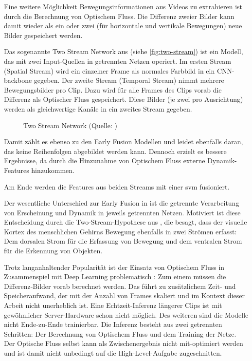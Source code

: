 Eine weitere Möglichkeit Bewegungsinformationen aus Videos zu extrahieren ist durch die Berechnung von Optischem Fluss.
Die Differenz zweier Bilder kann damit wieder als ein oder zwei (für horizontale und vertikale Bewegungen) neue Bilder gespeichert werden.

Das sogenannte Two Stream Network aus \cite{Simonyan14} (siehe \autoref{fig:two-stream}) ist ein Modell, das mit zwei Input-Quellen in getrennten Netzen operiert.
Im ersten Stream (Spatial Stream) wird ein einzelner Frame als normales Farbbild in ein CNN-backbone gegeben.
Der zweite Stream (Temporal Stream) nimmt mehrere Bewegungsbilder pro Clip.
Dazu wird für alle Frames des Clips vorab die Differenz als Optischer Fluss gespeichert.
Diese Bilder (je zwei pro Ausrichtung) werden als gleichwertige Kanäle in ein zweites Stream gegeben.

\begin{figure}[h!]
    \centering
    \caption{Two Stream Network (Quelle: \cite{Simonyan14})}
    \label{fig:two-stream}
\end{figure}

Damit zählt es ebenso zu den Early Fusion Modellen und leidet ebenfalls daran, das keine Reihenfolgen abgebildet werden kann.
Dennoch erzielt es bessere Ergebnisse, da durch die Hinzunahme von Optischem Fluss externe Dynamik-Features hinzukommen.

Am Ende werden die Features aus beiden Streams mit einer \gls{svm} fusioniert.

Der wesentliche Unterschied zur Early Fusion in \cite{Karpathy14} ist die getrennte Verarbeitung von Erscheinung und Dynamik in jeweils getrennten Netzen.
Motiviert ist diese Entscheidung durch die Two-Stream-Hypothese aus \cite{Goodale92}, die besagt, dass der visuelle Kortex des menschlichen Gehirns Bewegung ebenfalls in zwei Strömen erfasst:
Dem dorsalen Strom für die Erfassung von Bewegung und dem ventralen Strom für die Erkennung von Objekten.

Trotz langanhaltender Popularität ist der Einsatz von Optischem Fluss in Zusammenspiel mit Deep Learning problematisch \cite{Zhu17}:
Zum einem müssen die Differenz-Bilder vorab berechnet werden.
Das führt zu zusätzlichem Zeit- und Speicheraufwand, der mit der Anzahl von Frames skaliert und im Kontext dieser Arbeit nicht unerheblich ist.
Eine Echtzeit-Inferenz längerer Clips ist mit gewöhnlicher Server-Hardware schon nicht möglich.
Des weiteren sind die Modelle nicht Ende-zu-Ende trainierbar.
Die Inferenz besteht aus zwei getrennten Schritten: Der Berechnung von Optischem Fluss und dem Training der Netze.
Der Optische Fluss selbst kann als Zwischenergebnis nicht mit-optimiert werden und ist damit nicht unbedingt auf die High-Level-Aufgabe zugeschnitten.

